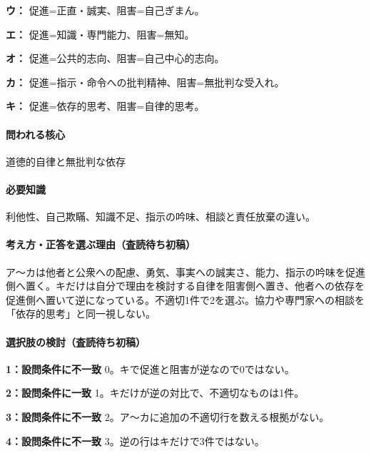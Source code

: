 \noindent\textbf{ウ：} 促進=正直・誠実、阻害=自己ぎまん。\par

\noindent\textbf{エ：} 促進=知識・専門能力、阻害=無知。\par

\noindent\textbf{オ：} 促進=公共的志向、阻害=自己中心的志向。\par

\noindent\textbf{カ：} 促進=指示・命令への批判精神、阻害=無批判な受入れ。\par

\noindent\textbf{キ：} 促進=依存的思考、阻害=自律的思考。\par

\paragraph{問われる核心} 道徳的自律と無批判な依存

\paragraph{必要知識} 利他性、自己欺瞞、知識不足、指示の吟味、相談と責任放棄の違い。

\paragraph{考え方・正答を選ぶ理由（査読待ち初稿）} ア〜カは他者と公衆への配慮、勇気、事実への誠実さ、能力、指示の吟味を促進側へ置く。キだけは自分で理由を検討する自律を阻害側へ置き、他者への依存を促進側へ置いて逆になっている。不適切1件で2を選ぶ。協力や専門家への相談を「依存的思考」と同一視しない。

\paragraph{選択肢の検討（査読待ち初稿）}\mbox{}\par

\noindent\textbf{1：設問条件に不一致} 0。キで促進と阻害が逆なので0ではない。\par

\noindent\textbf{2：設問条件に一致} 1。キだけが逆の対比で、不適切なものは1件。\par

\noindent\textbf{3：設問条件に不一致} 2。ア〜カに追加の不適切行を数える根拠がない。\par

\noindent\textbf{4：設問条件に不一致} 3。逆の行はキだけで3件ではない。\par

